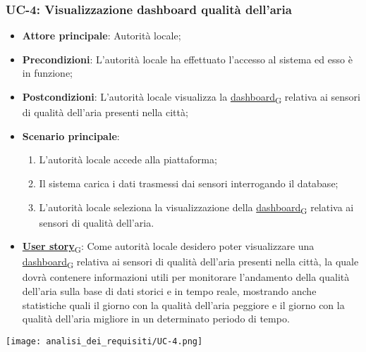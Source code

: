 \subsubsection{UC-4: Visualizzazione dashboard qualità dell'aria}
\begin{itemize}
	\item \textbf{Attore principale}: Autorità locale;
	\item \textbf{Precondizioni}: L'autorità locale ha effettuato l'accesso al sistema ed esso è in funzione;
	\item \textbf{Postcondizioni}: L'autorità locale visualizza la \href{https://7last.github.io/docs/rtb/documentazione-interna/glossario\#dashboard}{dashboard\textsubscript{G}} relativa
	      ai sensori di qualità dell'aria presenti nella città;
	\item \textbf{Scenario principale}:
	      \begin{enumerate}
		      \item L'autorità locale accede alla piattaforma;
		      \item Il sistema carica i dati trasmessi dai sensori interrogando il database;
		      \item L'autorità locale seleziona la visualizzazione della \href{https://7last.github.io/docs/rtb/documentazione-interna/glossario\#dashboard}{dashboard\textsubscript{G}} relativa ai sensori di qualità dell'aria.
	      \end{enumerate}
	\item \href{https://7last.github.io/docs/rtb/documentazione-interna/glossario\#user-story}{\textbf{User story}\textsubscript{G}}:
	      Come autorità locale desidero poter visualizzare una \href{https://7last.github.io/docs/rtb/documentazione-interna/glossario\#dashboard}{dashboard\textsubscript{G}} relativa ai sensori di qualità dell'aria presenti nella città, la quale
	      dovrà contenere informazioni utili per monitorare l'andamento della qualità dell'aria sulla base di dati storici e in tempo reale, mostrando
	      anche statistiche quali il giorno con la qualità dell'aria peggiore e il giorno con la qualità dell'aria migliore in un determinato periodo di tempo.
\end{itemize}
\begin{center}
	\texttt{[image: analisi\_dei\_requisiti/UC-4.png]}
\end{center}


